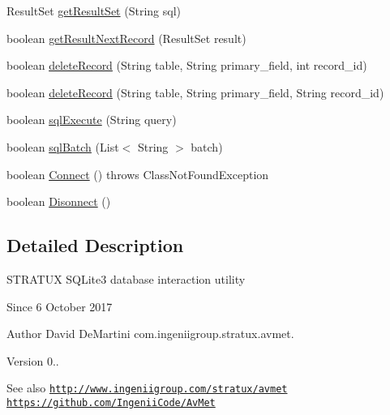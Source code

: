 \begin{DoxyCompactItemize}
\item 
Result\+Set \hyperlink{classcom_1_1ingeniigroup_1_1stratux_1_1db_connect_1_1_stratux_d_b_a72b53be8e33efb394803391c08d16597}{get\+Result\+Set} (String sql)
\item 
boolean \hyperlink{classcom_1_1ingeniigroup_1_1stratux_1_1db_connect_1_1_stratux_d_b_a13feda62749be8dcefbce61d44157fdb}{get\+Result\+Next\+Record} (Result\+Set result)
\item 
boolean \hyperlink{classcom_1_1ingeniigroup_1_1stratux_1_1db_connect_1_1_stratux_d_b_ac5a0af625918fe6b7fd588ac258da7e5}{delete\+Record} (String table, String primary\+\_\+field, int record\+\_\+id)
\item 
boolean \hyperlink{classcom_1_1ingeniigroup_1_1stratux_1_1db_connect_1_1_stratux_d_b_abd06900f0caa50a3b1f1cfe57ae700ee}{delete\+Record} (String table, String primary\+\_\+field, String record\+\_\+id)
\item 
boolean \hyperlink{classcom_1_1ingeniigroup_1_1stratux_1_1db_connect_1_1_stratux_d_b_a989eb70be919681871c2569d6875085f}{sql\+Execute} (String query)
\item 
boolean \hyperlink{classcom_1_1ingeniigroup_1_1stratux_1_1db_connect_1_1_stratux_d_b_aa2cb302f6c9ac8488fc2287b4486c5d3}{sql\+Batch} (List$<$ String $>$ batch)
\item 
boolean \hyperlink{classcom_1_1ingeniigroup_1_1stratux_1_1db_connect_1_1_stratux_d_b_a260c201ffd08c4e30c1fc5e3acdebf31}{Connect} ()  throws Class\+Not\+Found\+Exception 
\item 
boolean \hyperlink{classcom_1_1ingeniigroup_1_1stratux_1_1db_connect_1_1_stratux_d_b_a4da09c50c25ddd96bcbdc11057561dc6}{Disonnect} ()
\end{DoxyCompactItemize}


\subsection{Detailed Description}
S\+T\+R\+A\+T\+UX S\+Q\+Lite3 database interaction utility

\begin{DoxySince}{Since}
6 October 2017 
\end{DoxySince}
\begin{DoxyAuthor}{Author}
David De\+Martini  com.\+ingeniigroup.\+stratux.\+avmet. 
\end{DoxyAuthor}
\begin{DoxyVersion}{Version}
0.. 
\end{DoxyVersion}
\begin{DoxySeeAlso}{See also}
\href{http://www.ingeniigroup.com/stratux/avmet}{\tt http\+://www.\+ingeniigroup.\+com/stratux/avmet}  \href{https://github.com/IngeniiCode/AvMet}{\tt https\+://github.\+com/\+Ingenii\+Code/\+Av\+Met} 
\end{DoxySeeAlso}


